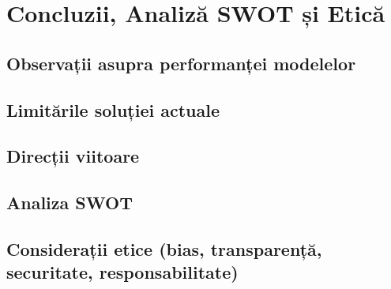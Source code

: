 \documentclass[runningheads,a4paper,11pt,twoside]{report}
\begin{document}
\chapter{Concluzii, Analiză SWOT și Etică}
\section{Observații asupra performanței modelelor}
\section{Limitările soluției actuale}
\section{Direcții viitoare}
\section{Analiza SWOT}
\section{Considerații etice (bias, transparență, securitate, responsabilitate)}


 
\end{document}
